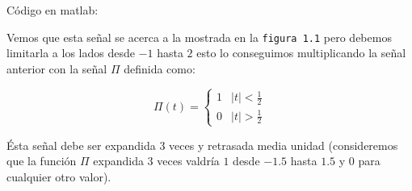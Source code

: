 \documentclass[10pt,a4paper]{report}
\begin{document}
Código en matlab:



Vemos que esta señal se acerca a la mostrada en la \texttt{figura 1.1} pero debemos limitarla a los lados desde $ -1 $ hasta $2$ esto lo conseguimos multiplicando la señal anterior con la señal $\Pi$ definida como:

\[ \Pi(t) = \left\{
              \begin{array}{lc}
                1&\left|t\right|<\frac12\\
                0&\left|t\right|>\frac12
              \end{array}
            \right.
\]

Ésta señal debe ser expandida 3 veces y retrasada media unidad (consideremos que la función $\Pi$ expandida 3 veces  valdría $1$ desde $-1.5$ hasta $1.5$ y $0$ para cualquier otro valor).
\end{document}
